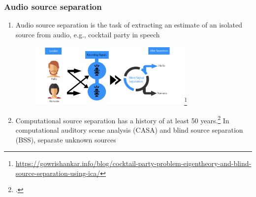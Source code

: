 \documentclass[usenames,dvipsnames]{beamer}
\begin{document}
\begin{frame}
	\frametitle{Audio source separation}
       \begin{enumerate}
               \item
                       Audio source separation is the task of extracting an estimate of an isolated source from audio, e.g., cocktail party in speech
		       \begin{figure}
		       \includegraphics[width=8cm]{./images-mila-presentation/bss.png}\footnote{\url{https://gowrishankar.info/blog/cocktail-party-problem-eigentheory-and-blind-source-separation-using-ica/}}
		       \vspace{-0.5em}
		       \end{figure}
	       \item
		       Computational source separation has a history of at least 50 years.\footcite{musicmask, musicsepintro1} In computational auditory scene analysis (CASA) and blind source separation (BSS), separate unknown sources
	              \end{enumerate}
\end{frame}
\end{document}

